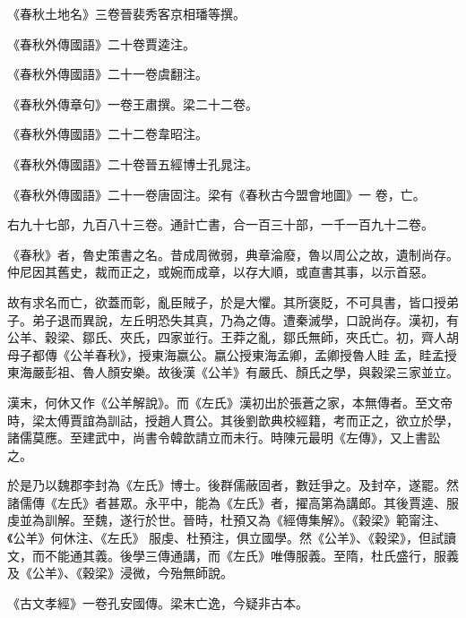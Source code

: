 \begin{pinyinscope}
 《春秋土地名》三卷晉裴秀客京相璠等撰。



 《春秋外傳國語》二十卷賈逵注。



 《春秋外傳國語》二十一卷虞翻注。



 《春秋外傳章句》一卷王肅撰。梁二十二卷。



 《春秋外傳國語》二十二卷韋昭注。



 《春秋外傳國語》二十卷晉五經博士孔晁注。



 《春秋外傳國語》二十一卷唐固注。梁有《春秋古今盟會地圖》一
 卷，亡。



 右九十七部，九百八十三卷。通計亡書，合一百三十部，一千一百九十二卷。



 《春秋》者，魯史策書之名。昔成周微弱，典章淪廢，魯以周公之故，遺制尚存。仲尼因其舊史，裁而正之，或婉而成章，以存大順，或直書其事，以示首惡。



 故有求名而亡，欲蓋而彰，亂臣賊子，於是大懼。其所褒貶，不可具書，皆口授弟子。弟子退而異說，左丘明恐失其真，乃為之傳。遭秦滅學，口說尚存。漢初，有公羊、穀梁、鄒氏、夾氏，四家並行。王莽之亂，鄒氏無師，夾氏亡。初，齊人胡母子都傳《公羊春秋》，授東海嬴公。嬴公授東海孟卿，孟卿授魯人眭
 孟，眭孟授東海嚴彭祖、魯人顏安樂。故後漢《公羊》有嚴氏、顏氏之學，與穀梁三家並立。



 漢末，何休又作《公羊解說》。而《左氏》漢初出於張蒼之家，本無傳者。至文帝時，梁太傅賈誼為訓詁，授趙人貫公。其後劉歆典校經籍，考而正之，欲立於學，諸儒莫應。至建武中，尚書令韓歆請立而未行。時陳元最明《左傳》，又上書訟之。



 於是乃以魏郡李封為《左氏》博士。後群儒蔽固者，數廷爭之。及封卒，遂罷。然諸儒傳《左氏》者甚眾。永平中，能為《左氏》者，擢高第為講郎。其後賈逵、服虔並為訓解。至魏，遂行於世。晉時，杜預又為《經傳集解》。《穀梁》範甯注、《公羊》何休注、《左氏》
 服虔、杜預注，俱立國學。然《公羊》、《穀梁》，但試讀文，而不能通其義。後學三傳通講，而《左氏》唯傳服義。至隋，杜氏盛行，服義及《公羊》、《穀梁》浸微，今殆無師說。



 《古文孝經》一卷孔安國傳。梁末亡逸，今疑非古本。




\end{pinyinscope}
